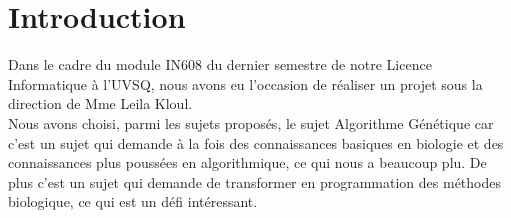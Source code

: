 \documentclass[a4paper,11pt]{article}
\title{\vspace{13em}{\huge Rapport Final}}
\author{Edouard Fouassier - Maxime Gonthier - Benjamin Guillot\\
		Laureline Martin - Rémi Navarro - Lydia Rodrigez de la Nava
		\vspace{2em}\\
		Algorithme Génétique
		\vspace{2em}}
\begin{document}
	
	\clearpage
	\maketitle\vspace{13em}
\newpage
\tableofcontents
\newpage\clearpage{}

	\section{Introduction}
		Dans le cadre du module IN608 du dernier semestre de notre Licence Informatique à l’UVSQ, nous avons eu l’occasion de réaliser un projet sous la direction de Mme Leila Kloul.\\
		Nous avons choisi, parmi les sujets proposés, le sujet Algorithme Génétique car c’est un sujet qui demande à la fois des connaissances basiques en biologie et des connaissances plus poussées en algorithmique, ce qui nous a beaucoup plu.
		De plus c’est un sujet qui demande de transformer en programmation des méthodes biologique, ce qui est un défi intéressant.\\
		
\end{document}
